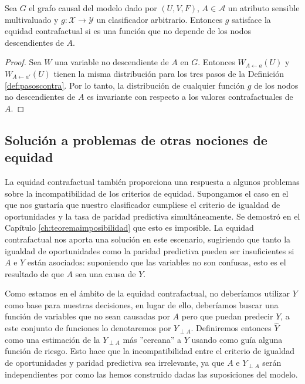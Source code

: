 \documentclass[oneside,openright,titlepage,numbers=noenddot,openany,headinclude,footinclude=true,
cleardoublepage=empty,abstractoff,BCOR=5mm,paper=a4,fontsize=12pt,main=spanish]{scrreprt}
\begin{document}
\begin{lemma} \label{lem:nodescent}
Sea $G$ el grafo causal del modelo dado por $(U,V,F)$, $A\in \mathcal{A}$ un atributo sensible multivaluado y $g\colon \mathcal{X} \to \mathcal{Y}$ un clasificador arbitrario. Entonces $g$ satisface la equidad contrafactual si es una función que no depende de los nodos descendientes de $A$.
\end{lemma}

\begin{proof}
Sea $W$ una variable no descendiente de $A$ en $G$. Entonces $W_{A\leftarrow a}(U)$ y $W_{A\leftarrow a'}(U)$ tienen la misma distribución para los tres pasos de la Definición \ref{def:pasoscontra}. Por lo tanto, la distribución de cualquier función $g$ de los nodos no descendientes de $A$ es invariante con respecto a los valores contrafactuales de $A$.
\end{proof}

\subsection*{Solución a problemas de otras nociones de equidad}

La equidad contrafactual también proporciona una respuesta a algunos problemas sobre la incompatibilidad de los criterios de equidad. Supongamos el caso en el que nos gustaría que nuestro clasificador cumpliese el criterio de igualdad de oportunidades y la tasa de paridad predictiva simultáneamente. Se demostró en el Capítulo \ref{ch:teoremaimposibilidad} que esto es imposible. La equidad contrafactual nos aporta una solución en este escenario, sugiriendo que tanto la igualdad de oportunidades como la paridad predictiva pueden ser insuficientes si $A$ e $Y$ están asociados: suponiendo que las variables no son confusas, esto es el resultado de que $A$ sea una causa de $Y$. 

Como estamos en el ámbito de la equidad contrafactual, no deberíamos utilizar $Y$ como base para nuestras decisiones, en lugar de ello, deberíamos buscar una función de variables que no sean causadas por $A$ pero que puedan predecir $Y$, a este conjunto de funciones lo denotaremos por $Y_{\perp A}$. Definiremos entonces $\hat{Y}$ como una estimación de la $Y_{\perp A}$ más ''cercana'' a $Y$ usando como guía alguna función de riesgo. Esto hace que la incompatibilidad entre el criterio de igualdad de oportunidades y paridad predictiva sea irrelevante, ya que $A$ e $Y_{\perp A}$ serán independientes por como las hemos construido dadas las suposiciones del modelo.
\end{document}
